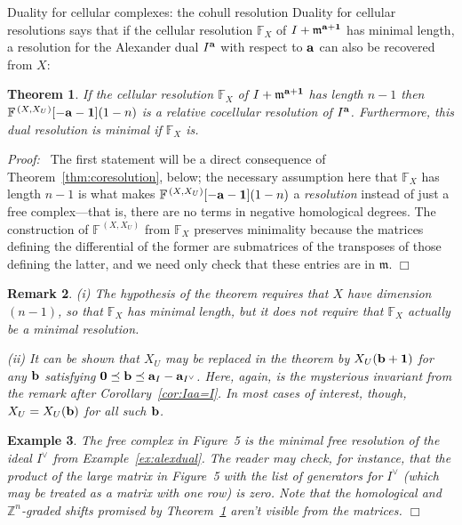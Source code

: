 \documentclass[12pt,leqno]{article}
\newtheorem{thm}{Theorem}[section]
\newtheorem{example}[thm]{Example}
\newtheorem{remark}[thm]{Remark}
\def\aa{{{\rm \bf a}}}
\def\bb{{{\rm \bf b}}}
\def\mm{{\mathfrak m}}
\def\FF{{\mathbb F}}
\def\ZZ{{\mathbb Z}}
\begin{document}
\begin{section}{Duality for cellular complexes: the cohull resolution}
Duality for cellular resolutions says that if the cellular resolution
$\FF_X$ of $I +\mm^{\aa + {\bf 1}}$ has minimal length, a resolution
for the Alexander dual $I^\aa$ with respect to $\aa$ can also be
recovered from $X$:
\begin{thm} \label{thm:relcocell}
If the cellular resolution $\FF_X$ of $I + \mm^{\aa + {\bf 1}}$ has
length $n-1$ then $\FF^{\,(X,X_U)}[-\aa -{\bf 1}](1-n)$ is a relative
cocellular resolution of $I^\aa$.  Furthermore, this dual resolution is
minimal if $\FF_X$ is.
\end{thm}
{\it Proof:\ } The first statement will be a direct consequence of
Theorem~\ref{thm:coresolution}, below; the necessary assumption here that
$\FF_X$ has length $n-1$ is what makes $\FF^{\,(X,X_U)}[-\aa -{\bf
1}](1-n)$ a \emph{resolution} instead of just a free complex---that is,
there are no terms in negative homological degrees.  The construction of
$\FF^{\,(X,X_U)}$ from $\FF_X$ preserves minimality because the matrices
defining the differential of the former are submatrices of the transposes
of those defining the latter, and we need only check that these entries
are in $\mm$.
%
\hfill
$\Box$

\begin{remark} \label{rk:relcocell} \rm
(i) The hypothesis of the theorem requires that $X$ have dimension
$(n-1)$, so that $\FF_X$ has minimal {\it length}, but it does not
require that $\FF_X$ actually be a minimal resolution.

\vskip 1mm \noindent
%
(ii) It can be shown that $X_U$ may be replaced in the theorem by
$X_U(\bb+{\bf 1})$ for any $\bb$ satisfying ${\bf 0} \preceq \bb \preceq
\aa_I - \aa_{I^\vee}$.  Here, again, is the mysterious invariant from the
remark after Corollary~\ref{cor:Iaa=I}.  In most cases of interest,
though, $X_U = X_U(\bb)$ for all such $\bb$.
\end{remark}

\begin{example} \label{ex:coscarf} \rm
The free complex in Figure~5 is the minimal free resolution of the ideal
$I^\vee$ from Example~\ref{ex:alexdual}.  The reader may check, for
instance, that the product of the large matrix in Figure~5 with the list
of generators for $I^\vee$ (which may be treated as a matrix with one
row) is zero.  Note that the homological and $\ZZ^n$-graded shifts
promised by Theorem~\ref{thm:relcocell} aren't visible from the matrices.
\hfill $\Box$
\end{example}


\end{section}
\end{document}
